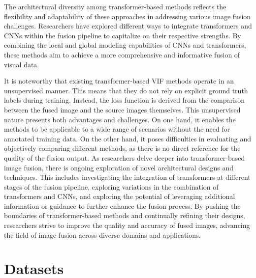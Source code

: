 The architectural diversity among transformer-based methods reflects the flexibility and adaptability of these approaches in addressing various image fusion challenges. Researchers have explored different ways to integrate transformers and CNNs within the fusion pipeline to capitalize on their respective strengths. By combining the local and global modeling capabilities of CNNs and transformers, these methods aim to achieve a more comprehensive and informative fusion of visual data. 

It is noteworthy that existing transformer-based VIF methods operate in an unsupervised manner. This means that they do not rely on explicit ground truth labels during training. Instead, the loss function is derived from the comparison between the fused image and the source images themselves. This unsupervised nature presents both advantages and challenges. On one hand, it enables the methods to be applicable to a wide range of scenarios without the need for annotated training data. On the other hand, it poses difficulties in evaluating and objectively comparing different methods, as there is no direct reference for the quality of the fusion output. As researchers delve deeper into transformer-based image fusion, there is ongoing exploration of novel architectural designs and techniques. This includes investigating the integration of transformers at different stages of the fusion pipeline, exploring variations in the combination of transformers and CNNs, and exploring the potential of leveraging additional information or guidance to further enhance the fusion process. By pushing the boundaries of transformer-based methods and continually refining their designs, researchers strive to improve the quality and accuracy of fused images, advancing the field of image fusion across diverse domains and applications.

\section{Datasets}

